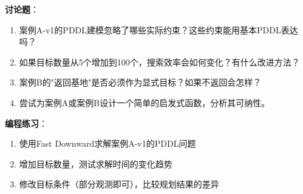 \begin{discussbox}
\textbf{讨论题}：
\begin{enumerate}
  \item 案例A-v1的PDDL建模忽略了哪些实际约束？这些约束能用基本PDDL表达吗？
  \item 如果目标数量从5个增加到100个，搜索效率会如何变化？有什么改进方法？
  \item 案例B的"返回基地"是否必须作为显式目标？如果不返回会怎样？
  \item 尝试为案例A或案例B设计一个简单的启发式函数，分析其可纳性。
\end{enumerate}

\textbf{编程练习}：
\begin{enumerate}
  \item 使用Fast Downward求解案例A-v1的PDDL问题
  \item 增加目标数量，测试求解时间的变化趋势
  \item 修改目标条件（部分观测即可），比较规划结果的差异
\end{enumerate}
\end{discussbox}
